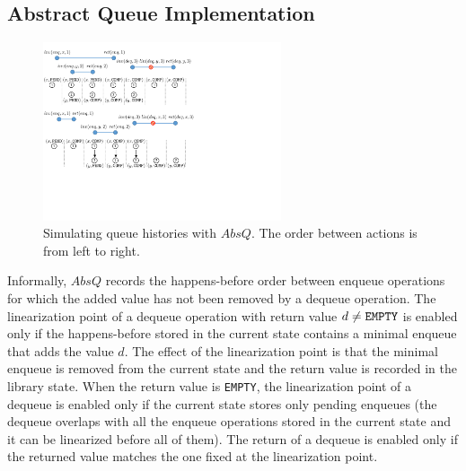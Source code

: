\vspace{-3.5mm}
\subsection{Abstract Queue Implementation}
\vspace{-1.5mm}
\begin{figure}
\vspace{-7mm}
\includegraphics[width=7cm]{fig-queue12.pdf}
%
\vspace{-8mm}
\caption{Simulating queue histories with $AbsQ$. The order between actions is from left to right.}
\label{fig:queueSim}
\vspace{-6mm}
\end{figure}
Informally, $AbsQ$ records the happens-before order between enqueue operations for which the added value has not been removed by a dequeue operation. The linearization point of a dequeue operation with return value $d\neq{\tt EMPTY}$ is enabled only if the happens-before stored in the current state contains a minimal enqueue that adds the value $d$. The effect of the linearization point is that the minimal enqueue is removed from the current state and the return value is recorded in the library state. When the return value is {\tt EMPTY}, the linearization point of a dequeue is enabled only if the current state stores only pending enqueues (the dequeue overlaps with all the enqueue operations stored in the current state and it can be linearized before all of them).  
The return of a dequeue is enabled only if the returned value matches the one fixed at the linearization point. 

